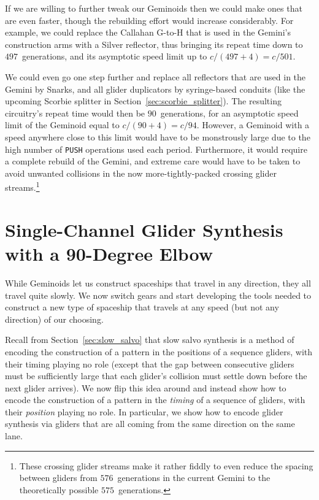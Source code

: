If we are willing to further tweak our Geminoids then we could make ones that are even faster, though the rebuilding effort would increase considerably. For example, we could replace the Callahan G-to-H that is used in the Gemini's construction arms with a Silver reflector, thus bringing its repeat time down to $497$~generations, and its asymptotic speed limit up to $c/(497+4) = c/501$.

We could even go one step further and replace all reflectors that are used in the Gemini by Snarks, and all glider duplicators by syringe-based conduits (like the upcoming Scorbie splitter in Section~\ref{sec:scorbie_splitter}). The resulting circuitry's repeat time would then be $90$~generations, for an asymptotic speed limit of the Geminoid equal to $c/(90+4) = c/94$. However, a Geminoid with a speed anywhere close to this limit would have to be monstrously large due to the high number of \texttt{PUSH} operations used each period. Furthermore, it would require a complete rebuild of the Gemini, and extreme care would have to be taken to avoid unwanted collisions in the now more-tightly-packed crossing glider streams.\footnote{These crossing glider streams make it rather fiddly to even reduce the spacing between gliders from $576$~generations in the current Gemini to the theoretically possible $575$~generations.}


\section{Single-Channel Glider Synthesis with a 90-Degree Elbow}\label{sec:single_channel_synth}

While Geminoids let us construct spaceships that travel in any direction, they all travel quite slowly. We now switch gears and start developing the tools needed to construct a new type of spaceship that travels at any speed (but not any direction) of our choosing.

Recall from Section~\ref{sec:slow_salvo} that slow salvo synthesis is a method of encoding the construction of a pattern in the positions of a sequence gliders, with their timing playing no role (except that the gap between consecutive gliders must be sufficiently large that each glider's collision must settle down before the next glider arrives). We now flip this idea around and instead show how to encode the construction of a pattern in the \emph{timing} of a sequence of gliders, with their \emph{position} playing no role. In particular, we show how to encode glider synthesis via gliders that are all coming from the same direction on the same lane.


